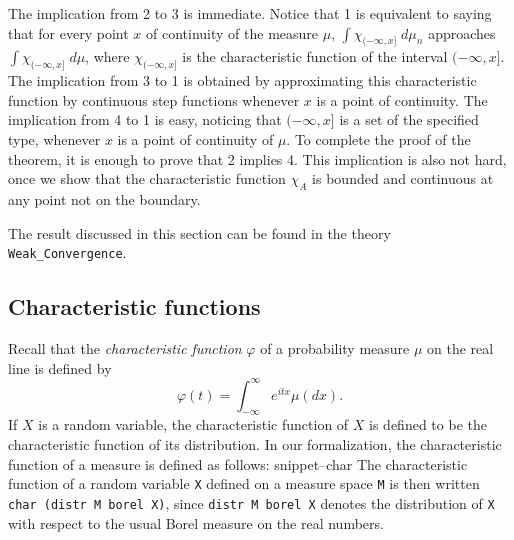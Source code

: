 \documentclass{svjour3}
\newcommand{\ph}{\varphi}
\newcommand{\Snippet}[1]{\csname snippet--#1\endcsname}
\begin{document}
The implication from 2 to 3 is immediate. Notice that 1 is equivalent to saying that for every point $x$ of continuity of the measure $\mu$, $\int \chi_{(-\infty,x]} \; d\mu_n$ approaches $\int \chi_{(-\infty,x]} \; d\mu$, where $\chi_{(-\infty,x]}$ is the characteristic function of the interval $(-\infty,x]$. The implication from 3 to 1 is obtained by approximating this characteristic function by continuous step functions whenever $x$ is a point of continuity. The implication from 4 to 1 is easy, noticing that $(-\infty,x]$ is a set of the specified type, whenever $x$ is a point of continuity of $\mu$. To complete the proof of the theorem, it is enough to prove that 2 implies 4. This implication is also not hard, once we show that the characteristic function $\chi_A$ is bounded and continuous at any point not on the boundary.

The result discussed in this section can be found in the theory \verb=Weak_Convergence=.

\subsection{Characteristic functions}
\label{subsection:characteristic}

Recall that the \emph{characteristic function} $\ph$ of a probability measure $\mu$ on the real line is defined by
\[
\ph(t) = \int_{-\infty}^{\infty} e^{itx} \mu(dx).
\]
If $X$ is a random variable, the characteristic function of $X$ is defined to be the characteristic function of its distribution.
In our formalization, the characteristic function of a measure is defined as follows:
\Snippet{char}
The characteristic function of a random variable \texttt{X} defined on a measure space \texttt{M} is then written \texttt{char (distr M borel X)}, since \texttt{distr M borel X} denotes the distribution of \texttt{X} with respect to the usual Borel measure on the real numbers.
\end{document}
